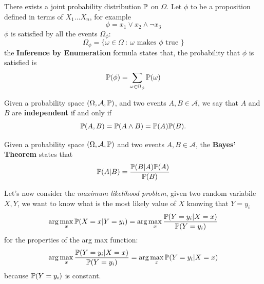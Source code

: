 \documentclass[10pt, letterpaper]{report}
\begin{document}
There exists a joint probability distribution ${\mathbb P}$ on $\Omega$. Let $\phi$ to be a proposition defined in terms of $X_1\dots X_n$, for example\begin{equation}
    \phi=x_1\lor x_2 \land \lnot x_3
\end{equation}
$\phi$ is satisfied by all the events $\Omega_\phi$:\begin{equation}
    \Omega_\phi=\{\omega\in \Omega \ : \ \omega \text{ makes } \phi \text{ true }\}
\end{equation}
the \textbf{Inference by Enumeration} formula states that, the probability that $\phi$ is satisfied is \begin{equation}
    {\mathbb P}(\phi)=\sum_{\omega\in  \Omega_\phi}{\mathbb P}(\omega)
\end{equation}
\begin{definition}
    Given a probability space $(\Omega,\mathcal A,{\mathbb P})$, and two events $A,B\in\mathcal A$, we say that $A$ and $B$ are \textbf{independent} if and only if\begin{equation}
        {\mathbb P}(A, B)={\mathbb P}(A\land B)={\mathbb P}(A){\mathbb P}(B).
    \end{equation}
\end{definition}
\begin{theorem}
    Given a probability space $(\Omega,\mathcal A,{\mathbb P})$ and two events $A,B\in\mathcal A$, the \textbf{Bayes' Theorem} states that\begin{equation}
        {\mathbb P}(A|B)=\frac{{\mathbb P}(B|A){\mathbb P}(A)}{{\mathbb P}(B)}
    \end{equation}
\end{theorem}
Let's now consider the \textit{maximum likelihood problem}, given two random variabile $X,Y$, we want to know what is the most likely value of $X$ knowing that $Y=y_i$\begin{equation}
    \arg\max_{x}{\mathbb P}(X=x|Y=y_i)=\arg\max_{x}\frac{{\mathbb P}(Y=y_i|X=x)}{{\mathbb P}(Y=y_i)}
\end{equation}
for the properties of the arg max function:\begin{equation}
    \arg\max_{x}\frac{{\mathbb P}(Y=y_i|X=x)}{{\mathbb P}(Y=y_i)}=\arg\max_{x}{{\mathbb P}(Y=y_i|X=x)}
\end{equation}
because ${\mathbb P}(Y=y_i)$ is constant.
\end{document}
